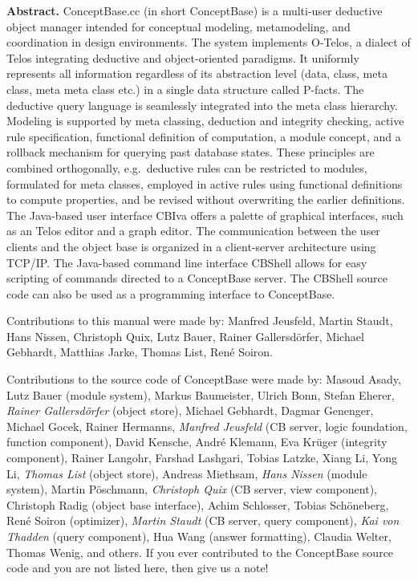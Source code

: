 \begin{titlepage}
{\bf Abstract.} ConceptBase.cc (in short ConceptBase) is a multi-user deductive object manager 
intended for conceptual modeling, metamodeling, and coordination in design
environments. The system implements O-Telos, a dialect of Telos 
integrating deductive and object-oriented paradigms.
It uniformly represents all information regardless of its abstraction
level (data, class, meta class, meta meta class etc.) in a single
data structure called P-facts. 
The deductive query language is seamlessly integrated
into the meta class hierarchy. Modeling is supported by meta classing,
deduction and integrity checking, active rule specification, functional definition of computation,
a module concept, and a rollback mechanism for querying past database states.
These principles are combined orthogonally, e.g.\ deductive rules
can be restricted to modules, formulated for meta classes, employed in active rules using
functional definitions to compute properties, and be revised without overwriting the earlier
definitions.
The Java-based user interface CBIva offers
a palette of graphical interfaces, such as an Telos editor and a graph editor.
The communication between the user clients and the object base is
organized in a client-server architecture using TCP/IP. The Java-based
command line interface CBShell allows for easy scripting of commands
directed to a ConceptBase server. The CBShell source code can also
be used as a programming interface to ConceptBase.


\vfill

Contributions to this manual were made by: Manfred Jeusfeld, Martin Staudt, 
Hans Nissen, Christoph Quix, Lutz Bauer, Rainer
Gallersd\"orfer, Michael Gebhardt, Matthias Jarke, 
Thomas List, Ren\'e Soiron.

\vspace{0.7cm}

Contributions to the source code of ConceptBase were made by: Masoud Asady, Lutz Bauer (module system),
Markus Baumeister, Ulrich Bonn, Stefan Eherer, 
{\it Rainer Gallersd\"orfer\/} (object store), Michael Gebhardt, Dagmar Genenger, Michael Gocek, Rainer Hermanns,
{\it Manfred Jeusfeld\/} (CB server, logic foundation, function component), 
David Kensche, Andr\'e Klemann, 
Eva Kr\"uger (integrity component),
Rainer Langohr, Farshad Lashgari, Tobias Latzke, Xiang Li, Yong Li, 
{\it Thomas List\/} (object store), Andreas Miethsam, {\it Hans Nissen\/} (module system), 
Martin P\"oschmann, 
{\it Christoph Quix\/} (CB server, view component), Christoph Radig (object base interface),
Achim Schlosser, Tobias Sch\"oneberg,
Ren\'e Soiron (optimizer), 
{\it Martin Staudt\/} (CB server, query component), {\it Kai von Thadden\/} (query component), Hua Wang (answer formatting),
Claudia Welter, Thomas Wenig, and others.
If you ever contributed to the ConceptBase source code and
you are not listed here, then give us a note! 

\end{titlepage}



